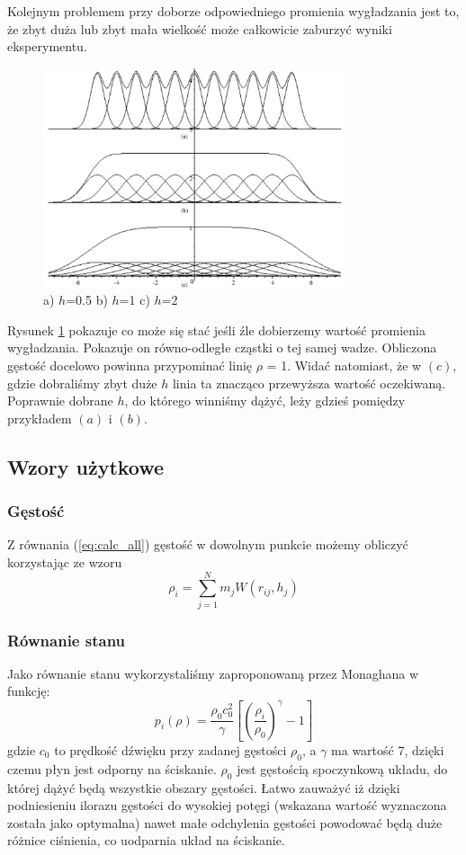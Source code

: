 \documentclass[polish, 12pt]{aghthesis}
\begin{document}
			Kolejnym problemem przy doborze odpowiedniego promienia wygładzania jest to, że zbyt duża lub zbyt mała wielkość może całkowicie zaburzyć wyniki eksperymentu.
			\begin{figure}[h!]
			\centering
			\includegraphics[width=0.8\textwidth]{smoothing.png}
			\caption{a) $h$=0.5 b) $h$=1 c) $h$=2}
			\label{fig:smoothing}
			\end{figure}
			Rysunek \ref{fig:smoothing} pokazuje co może się stać jeśli źle dobierzemy wartość promienia wygładzania. Pokazuje on równo-odległe cząstki o tej samej wadze. Obliczona gęstość docelowo powinna przypominać linię ${\rho}$ = 1. Widać natomiast, że w $(c)$, gdzie dobraliśmy zbyt duże $h$ linia ta znacząco przewyższa wartość oczekiwaną. Poprawnie dobrane $h$, do którego winniśmy dążyć, leży gdzieś pomiędzy przykładem $(a)$ i $(b)$.
			
		\subsection{Wzory użytkowe}
			\subsubsection{Gęstość}
			Z równania (\ref{eq:calc_all}) gęstość w dowolnym punkcie możemy obliczyć korzystając ze wzoru \[{\rho}_i=\sum_{j=1}^{N}m_jW(r_{ij},h_j) \label{eq:calc_density} \tag{8}\] 
			\subsubsection{Równanie stanu}
			Jako równanie stanu wykorzystaliśmy zaproponowaną przez Monaghana w \cite{Monaghan} funkcję:
			\[p_i(\rho)=\frac{\rho_0 c_0^2}{\gamma}[(\frac{\rho_i}{\rho_0})^{\gamma} - 1] \label{eq:calc_state} \tag{8}\]
			gdzie ${c_0}$ to prędkość dźwięku przy zadanej gęstości ${\rho_0}$, a ${\gamma}$ ma wartość 7, dzięki czemu płyn jest odporny na ściskanie. $\rho_0$ jest gęstością spoczynkową układu, do której dążyć będą wszystkie obszary gęstości. Łatwo zauważyć iż dzięki podniesieniu ilorazu gęstości do wysokiej potęgi (wskazana wartość wyznaczona została jako optymalna) nawet małe odchylenia gęstości powodować będą duże różnice ciśnienia, co uodparnia układ na ściskanie.
			
\end{document}
